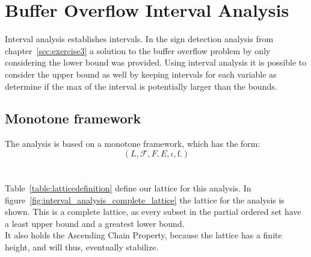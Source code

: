 {\setlength{\chapterfontsize}{24pt}
\chapter{Buffer Overflow Interval Analysis}
}
Interval analysis establishes intervals. In the sign detection analysis from chapter~\ref{sec:exercise3} a solution to the buffer overflow problem by only considering the lower bound was provided. Using interval analysis it is possible to consider the upper bound as well by keeping intervals for each variable as determine if the max of the interval is potentially larger than the bounds.

\section{Monotone framework}
The analysis is based on a monotone framework, which has the form:
\begin{equation}
  \left(L, \mathcal{F}, F, E, \iota, \mathrm{f}.  \right)
  \label{eq:monotone_framework}
\end{equation}
\\\\
Table~\ref{table:latticedefinition} define our lattice for this analysis. In figure~\ref{fig:interval_analysis_complete_lattice} the lattice for the analysis is shown. This is a complete lattice, as every subset in the partial ordered set have a least upper bound and a greatest lower bound.\\
It also holds the Ascending Chain Property, because the lattice has a finite height, and will thus, eventually stabilize.
